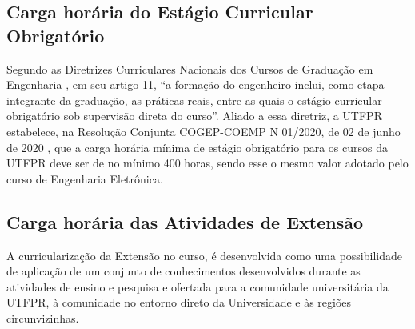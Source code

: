 
\subsection{Carga horária do Estágio Curricular Obrigatório}

Segundo as Diretrizes Curriculares Nacionais dos Cursos de Graduação em Engenharia \cite{dcneng}, em seu artigo 11, ``a formação  do  engenheiro  inclui,  como  etapa  integrante da  graduação, as práticas reais, entre as quais o estágio curricular obrigatório sob supervisão direta do curso''. Aliado a essa diretriz, a UTFPR estabelece, na Resolução Conjunta COGEP-COEMP N\textordmasculine{} 01/2020, de 02 de junho de 2020 \cite{cogepcoemp1:2020}, que a carga horária mínima de estágio obrigatório para os cursos da UTFPR deve ser de no mínimo 400 horas, sendo esse o mesmo valor adotado pelo curso de Engenharia Eletrônica.






\subsection{Carga horária das Atividades de Extensão}
\label{sub:extch}

A curricularização da Extensão no curso, é desenvolvida como uma possibilidade de aplicação de um conjunto de conhecimentos desenvolvidos durante as atividades de ensino e pesquisa e ofertada para a comunidade universitária da UTFPR, à comunidade no entorno direto da Universidade e às regiões circunvizinhas.

